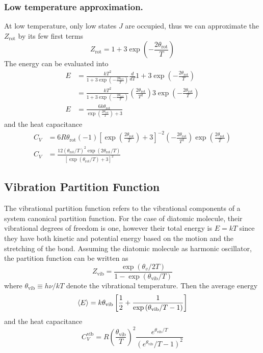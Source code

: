 \documentclass[../../../Main.tex]{subfiles}
\begin{document}
\subsubsection{Low temperature approximation.} At low temperature, only low states $J$ are occupied, thus we can approximate the $Z_\text{rot}$ by its few first terms
\begin{equation*}
	Z_\text{rot}=1+3\exp\left(-\frac{2\theta_\text{rot}}{T}\right)
\end{equation*}
The energy can be evaluated into
\begin{align*}
	E & =\frac{kT^2}{1+3\exp\left(-\frac{2\theta_\text{rot}}{T}\right)}\frac{d}{dT}1+3\exp\left(-\frac{2\theta_\text{rot}}{T}\right)                              \\
	  & =\frac{kT^2}{1+3\exp\left(-\frac{2\theta_\text{rot}}{T}\right)}\left(\frac{2\theta_\text{rot}}{T^2}\right)3\exp\left(-\frac{2\theta_\text{rot}}{T}\right) \\
	E & =\frac{6k\theta_\text{rot}}{\exp\left(\frac{2\theta_\text{rot}}{T}\right)+3}
\end{align*}
and the heat capacitance
\begin{align*}
	C_V & =6R\theta_\text{rot}(-1)\left[\exp\left(\frac{2\theta_\text{rot}}{T}\right)+3\right]^{-2}\left(-\frac{2\theta_\text{rot}}{T^2}\right)\exp\left(\frac{2\theta_\text{rot}}{T}\right) \\
	C_V & =\frac{12(\theta_\text{rot}/T)^2\exp(2\theta_\text{rot}/T)}{\left[\exp(\theta_\text{rot}/T)+3\right]^2}
\end{align*}

\subsection{Vibration Partition Function}
The vibrational partition function refers to the vibrational components of a system canonical partition function.
For the case of diatomic molecule, their vibrational degrees of freedom is one, however their total energy is $E=kT$ since they have both kinetic and potential energy based on the motion and the stretching of the bond.
Assuming the diatomic molecule as harmonic oscillator, the partition function can be written as
\begin{equation*}
	Z_\text{vib}=\frac{\exp\left({\theta_v}/{2T}\right)}{1-\exp\left({\theta_\text{vib}}/{T}\right)}
\end{equation*}
where $\theta_\text{vib}\equiv h\nu/kT$ denote the vibrational temperature. Then the average energy
\begin{equation*}
	\braket{E}=k\theta_\text{vib}\left[\frac{1}{2}+\frac{1}{\exp\left(\theta_\text{vib}/T-1\right)}\right]
\end{equation*}
and the heat capacitance
\begin{equation*}
	C_V^{\text{vib}}=R\left(\frac{\theta_\text{vib}}{T}\right)^2\frac{e^{\theta_\text{vib}/T}}{(e^{\theta_\text{vib}}/T-1)^2}
\end{equation*}
\end{document}
